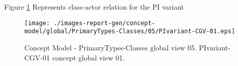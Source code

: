 Figure \ref{fig:lu.uni.lassy.excalibur.MyCrash.G02-CM-view-global-PrimaryTypes-Classes-05} Represents class-actor relation for the PI variant



\begin{figure}[htbp] 
\label{fig:lu.uni.lassy.excalibur.MyCrash.G02-CM}
\begin{center}
\texttt{[image: ./images-report-gen/concept-model/global/PrimaryTypes-Classes/05/PIvariant-CGV-01.eps]}
\end{center}
\caption[Concept Model - PrimaryTypes-Classes global view 05 - PIvariant-CGV-01 concept global view]{Concept Model - PrimaryTypes-Classes global view 05. PIvariant-CGV-01 concept global view 01.}
\label{fig:lu.uni.lassy.excalibur.MyCrash.G02-CM-view-global-PrimaryTypes-Classes-05}
\end{figure}
\vspace{0.5cm} 
